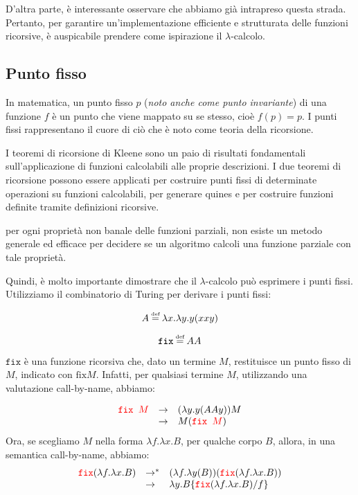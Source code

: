 D'altra parte, è interessante osservare che abbiamo già intrapreso questa strada. Pertanto, per garantire
un'implementazione efficiente e strutturata delle funzioni ricorsive, è auspicabile prendere 
come ispirazione il $\lambda$-calcolo.

\subsection{Punto fisso}
In matematica, un punto fisso $p$
(\textit{noto anche come punto invariante}) di una funzione $f$ è un punto che viene
mappato su se stesso, cioè $f(p) = p$. I punti fissi rappresentano il cuore di
ciò che è noto come teoria della ricorsione.

\begin{tcolorbox}[title = Teoremi di ricorsione di Kleene]
I teoremi di ricorsione di Kleene
sono un paio di risultati fondamentali sull'applicazione di funzioni calcolabili
alle proprie descrizioni. I due teoremi di ricorsione possono essere applicati per
costruire punti fissi di determinate operazioni su funzioni calcolabili, per generare
quines e per costruire funzioni definite tramite definizioni ricorsive.
\end{tcolorbox}

\begin{theorem}[Rice]
per ogni proprietà non
banale delle funzioni parziali, non esiste un metodo generale ed efficace per decidere
se un algoritmo calcoli una funzione parziale con tale proprietà.
\end{theorem}
Quindi, è molto importante dimostrare che il $\lambda$-calcolo può esprimere i punti fissi. Utilizziamo il combinatorio di Turing per derivare i punti fissi:

\[A \defeq \lambda x. \lambda y. y(xxy)\]

\[\texttt{fix} \defeq AA\]

$\texttt{fix}$ è una funzione ricorsiva che, dato un termine $M$,
restituisce un punto fisso di $M$, indicato con $\text{fix}M$.
Infatti, per qualsiasi termine $M$, utilizzando una valutazione call-by-name, abbiamo:

\[
  \begin{array}{lll}
    \textcolor{red}{\texttt{fix }M} & \rightarrow & (\lambda y.y(AAy))M \\
    & \rightarrow & M(\textcolor{red}{\texttt{fix }M}) \\
  \end{array}                
\]
Ora, se scegliamo $M$ nella forma $\lambda f.\lambda x.B$, per qualche
corpo $B$, allora, in una semantica call-by-name, abbiamo:
\[
  \begin{array}{lll}
    \textcolor{red}{\texttt{fix}} (\lambda f.\lambda x.B) & \rightarrow^* &
    (\lambda f.\lambda y(B))(\textcolor{red}{\texttt{fix}} (\lambda f. \lambda x.B)) \\
    & \rightarrow & \lambda y.B\{\textcolor{red}{\texttt{fix}} (\lambda f. \lambda x.B) / f\}\\
  \end{array}  
\]
